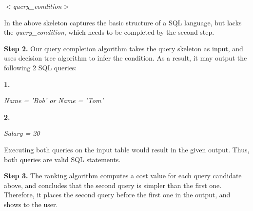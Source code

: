 
 \textit{$<$\textit{query\_condition}$>$}

\vspace{1mm}
In the above skeleton captures the basic structure of a SQL language, but
lacks the \textit{query\_condition}, which needs to be completed by
the second step.

\vspace{1mm}

 \noindent\textbf{Step 2.} Our query completion algorithm takes the query skeleton
as input, and uses decision tree algorithm to infer the condition. As
a result, it may output the following 2 SQL queries:

\textbf{1.} 

\hspace{3mm}

\hspace{3mm} \textit{\textit{Name = 'Bob' or Name = 'Tom'}}


\vspace{1mm}
\textbf{2.} 

\hspace{3mm}

\hspace{3mm} \textit{\textit{Salary = 20}}

Executing both queries on the input table would result in the given output.
Thus, both queries are valid SQL statements.

\vspace{1mm}

 \noindent\textbf{Step 3.} The ranking algorithm computes a cost value for
each query candidate above, and concludes that the second query is simpler
than the first one. Therefore, it places the second query before the first one
in the output, and shows to the user.
